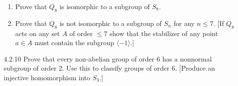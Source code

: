 \documentclass[9pt]{article}
\newcommand{\cyc}[1]{\langle #1 \rangle}
\begin{document}
\begin{enumerate}
\begin{enumerate}
                     \item Prove that $Q_8$ is isomorphic to a subgroup of
                           $S_8$.
                     \item Prove that $Q_8$ is not isomorphic to a subgroup of
                           $S_n$ for any $n \le 7$. [If $Q_8$ acts on any set
                           $A$ of order $\le 7$ show that the stabilizer of any
                           point $a \in A$ must contain the subgroup
                           $\cyc{-1}$.]
                  \end{enumerate}
   \item[4.2.10]  Prove that every non-abelian group of order 6 has a nonnormal
                  subgroup of order 2. Use this to classify groups of order 6.
                  [Produce an injective homomorphism into $S_3$.]
\end{enumerate}
\end{document}

